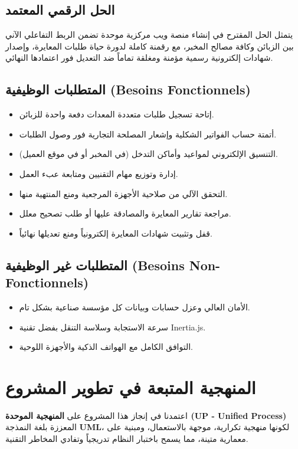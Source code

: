 \documentclass{bts-report-ar}
\begin{document}
\subsection{الحل الرقمي المعتمد}
يتمثل الحل المقترح في إنشاء منصة ويب مركزية موحدة تضمن الربط التفاعلي الآني بين الزبائن وكافة مصالح المخبر، مع رقمنة كاملة لدورة حياة طلبات المعايرة، وإصدار شهادات إلكترونية رسمية مؤمنة ومغلقة تماماً ضد التعديل فور اعتمادها النهائي.

\subsection{المتطلبات الوظيفية (Besoins Fonctionnels)}
\begin{itemize}
  \item إتاحة تسجيل طلبات متعددة المعدات دفعة واحدة للزبائن.
  \item أتمتة حساب الفواتير الشكلية وإشعار المصلحة التجارية فور وصول الطلبات.
  \item التنسيق الإلكتروني لمواعيد وأماكن التدخل (في المخبر أو في موقع العميل).
  \item إدارة وتوزيع مهام التقنيين ومتابعة عبء العمل.
  \item التحقق الآلي من صلاحية الأجهزة المرجعية ومنع المنتهية منها.
  \item مراجعة تقارير المعايرة والمصادقة عليها أو طلب تصحيح معلل.
  \item قفل وتثبيت شهادات المعايرة إلكترونياً ومنع تعديلها نهائياً.
\end{itemize}

\subsection{المتطلبات غير الوظيفية (Besoins Non-Fonctionnels)}
\begin{itemize}
  \item الأمان العالي وعزل حسابات وبيانات كل مؤسسة صناعية بشكل تام.
  \item سرعة الاستجابة وسلاسة التنقل بفضل تقنية Inertia.js.
  \item التوافق الكامل مع الهواتف الذكية والأجهزة اللوحية.
\end{itemize}

\section{المنهجية المتبعة في تطوير المشروع}
اعتمدنا في إنجاز هذا المشروع على \textbf{المنهجية الموحدة (UP - Unified Process)} المعززة بلغة النمذجة \textbf{UML}، لكونها منهجية تكرارية، موجهة بالاستعمال، ومبنية على معمارية متينة، مما يسمح باختبار النظام تدريجياً وتفادي المخاطر التقنية.
\end{document}
